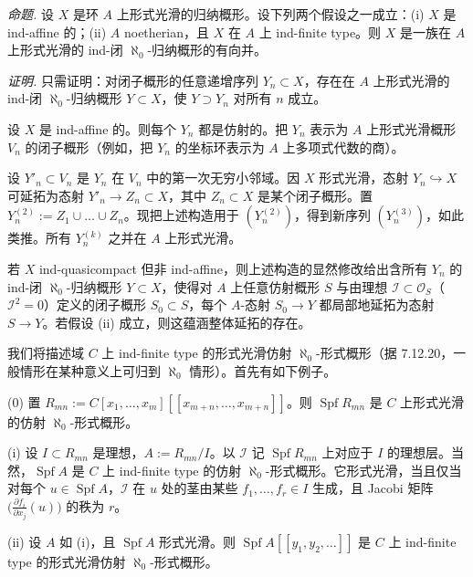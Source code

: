  \emph{命题.} 设 $X$ 是环 $A$ 上形式光滑的归纳概形。设下列两个假设之一成立：(i) $X$ 是 ind-affine 的；(ii) $A$ noetherian，且 $X$ 在 $A$ 上 ind-finite type。则 $X$ 是一族在 $A$ 上形式光滑的 ind-闭 $\aleph_0$-归纳概形的有向并。

\emph{证明.} 只需证明：对闭子概形的任意递增序列 $Y_n\subset X$，存在在 $A$ 上形式光滑的 ind-闭 $\aleph_0$-归纳概形 $Y\subset X$，使 $Y\supset Y_n$ 对所有 $n$ 成立。

设 $X$ 是 ind-affine 的。则每个 $Y_n$ 都是仿射的。把 $Y_n$ 表示为 $A$ 上形式光滑概形 $V_n$ 的闭子概形（例如，把 $Y_n$ 的坐标环表示为 $A$ 上多项式代数的商）。


设 $Y'_n\subset V_n$ 是 $Y_n$ 在 $V_n$ 中的第一次无穷小邻域。因 $X$ 形式光滑，态射 $Y_n\hookrightarrow X$ 可延拓为态射 $Y'_n\to Z_n\subset X$，其中 $Z_n\subset X$ 是某个闭子概形。置 $Y^{(2)}_n:=Z_1\cup\ldots\cup Z_n$。现把上述构造用于 $(Y^{(2)}_n)$，得到新序列 $(Y^{(3)}_n)$，如此类推。所有 $Y^{(k)}_n$ 之并在 $A$ 上形式光滑。

若 $X$ ind-quasicompact 但非 ind-affine，则上述构造的显然修改给出含所有 $Y_n$ 的 ind-闭 $\aleph_0$-归纳概形 $Y\subset X$，使得对 $A$ 上任意仿射概形 $S$ 与由理想 $\mathcal{I}\subset\mathcal{O}_S$（$\mathcal{I}^2=0$）定义的闭子概形 $S_0\subset S$，每个 $A$-态射 $S_0\to Y$ 都局部地延拓为态射 $S\to Y$。若假设 (ii) 成立，则这蕴涵整体延拓的存在。

 我们将描述域 $C$ 上 ind-finite type 的形式光滑仿射 $\aleph_0$-形式概形（据 7.12.20，一般情形在某种意义上可归到 $\aleph_0$ 情形）。首先有如下例子。

(0) 置 $R_{mn}:=C[x_1,\ldots,x_m][[x_{m+n},\ldots,x_{m+n}]]$。则 $\operatorname{Spf}R_{mn}$ 是 $C$ 上形式光滑的仿射 $\aleph_0$-形式概形。

(i) 设 $I\subset R_{mn}$ 是理想，$A:=R_{mn}/I$。以 $\mathcal{I}$ 记 $\operatorname{Spf}R_{mn}$ 上对应于 $I$ 的理想层。当然，$\operatorname{Spf}A$ 是 $C$ 上 ind-finite type 的仿射 $\aleph_0$-形式概形。它形式光滑，当且仅当对每个 $u\in\operatorname{Spf}A$，$\mathcal{I}$ 在 $u$ 处的茎由某些 $f_1,\ldots,f_r\in I$ 生成，且 Jacobi 矩阵 $\bigl(\frac{\partial f_i}{\partial x_j}(u)\bigr)$ 的秩为 $r$。

(ii) 设 $A$ 如 (i)，且 $\operatorname{Spf}A$ 形式光滑。则 $\operatorname{Spf}A[[y_1,y_2,\ldots]]$ 是 $C$ 上 ind-finite type 的形式光滑仿射 $\aleph_0$-形式概形。

